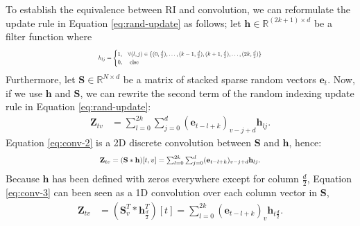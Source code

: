 \documentclass[11pt]{article}
\begin{document}
To establish the equivalence between RI and convolution, we can reformulate the update rule in Equation \eqref{eq:rand-update} as follows; let $\mathbf{h} \in \mathbb{R}^{(2k+1) \times d}$ be a filter function where
\begin{equation*}
\resizebox{0.49\textwidth}{!}{$h_{lj} = \begin{cases} 1, & \forall (l,j) \in \{(0, \frac{d}{2}), \dots, (k-1, \frac{d}{2}), (k+1, \frac{d}{2}), \dots, (2k, \frac{d}{2})\} \\
                                       0, & \mbox{ else}
                \end{cases}$}
\end{equation*}
Furthermore, let $\mathbf{S} \in \mathbb{R}^{N \times d}$ be a matrix of stacked sparse random vectors $\textbf{e}_t$.
Now, if we use $\mathbf{h}$ and $\mathbf{S}$, we can rewrite the second term of the random indexing update rule in Equation \eqref{eq:rand-update}:
\begin{align}
    \label{eq:conv-2}
    \mathbf{Z}_{tv} & = \sum_{l=0}^{2k} \sum_{j=0}^{d} (\textbf{e}_{t-l+k})_{v-j+d} \mathbf{h}_{lj}.
\end{align}
Equation \eqref{eq:conv-2} is a 2D discrete convolution between $\mathbf{S}$ and $\mathbf{h}$, hence:
\begin{equation}
    \label{eq:conv-3}
    \resizebox{0.48\textwidth}{!}{$\mathbf{Z}_{tv} = (\mathbf{S} \ast \mathbf{h})[t, v] = \sum_{l=0}^{2k} \sum_{j=0}^{d} (\textbf{e}_{t-l+k})_{v-j+d} \mathbf{h}_{lj}.$}
\end{equation}
Because $\mathbf{h}$ has been defined with zeros everywhere except for column $\frac{d}{2}$, Equation \eqref{eq:conv-3} can been seen as a 1D convolution over each column vector in $\mathbf{S}$,
\begin{align}
    \label{eq:conv-4}
    \mathbf{Z}_{tv} & = (\mathbf{S}^{T}_{v} \ast \mathbf{h}^{T}_{\frac{d}{2}})[t] = \sum_{l=0}^{2k}( \textbf{e}_{t-l+k})_{v} \mathbf{h}_{t\frac{d}{2}}.
\end{align}
\end{document}
